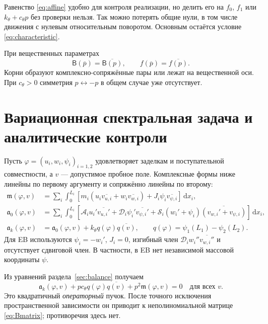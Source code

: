 \documentclass[11pt,a4paper]{article}
\numberwithin{equation}{section}
\newcommand{\dd}{\,\mathrm d}
\newcommand{\A}{\mathcal A}
\newcommand{\D}{\mathcal D}
\newcommand{\Sbeam}{\mathcal S}
\newcommand{\kth}{k_\theta}
\newcommand{\cth}{c_\theta}
\newcommand{\BB}{\mathsf B}
\begin{document}
Равенство \eqref{eq:affine} удобно для контроля реализации, но делить
его на $f_0$, $f_1$ или $\kth+\cth p$ без проверки нельзя. Так можно
потерять общие нули, в том числе движения с нулевым относительным
поворотом. Основным остаётся условие \eqref{eq:characteristic}.

При вещественных параметрах
\begin{equation}
 \BB(\overline p)=\overline{\BB(p)},\qquad
 f(\overline p)=\overline{f(p)}.
 \label{eq:conjugate}
\end{equation}
Корни образуют комплексно-сопряжённые пары или лежат на вещественной оси.
При $\cth>0$ симметрия $p\leftrightarrow-p$ в общем случае уже отсутствует.

\section{Вариационная спектральная задача и аналитические контроли}
\label{sec:weak}

Пусть $\varphi=(u_i,w_i,\psi_i)_{i=1,2}$ удовлетворяет заделкам и
поступательной совместности, а $v$ --- допустимое пробное поле.
Комплексные формы ниже линейны по первому аргументу и сопряжённо линейны
по второму:
\begin{align}
 \mathfrak m(\varphi,v)
 &=\sum_i\int_0^{L_i}
 [m_i(u_i\overline{v_{u,i}}+w_i\overline{v_{w,i}})
   +J_i\psi_i\overline{v_{\psi,i}}]\dd x_i,\label{eq:massform}\\
 \mathfrak a_0(\varphi,v)
 &=\sum_i\int_0^{L_i}
 [\A_i u_i'\overline{v_{u,i}'}+\D_i\psi_i'\overline{v_{\psi,i}'}
 +\Sbeam_i(w_i'+\psi_i)\overline{(v_{w,i}'+v_{\psi,i})}]\dd x_i,
 \label{eq:stiffform}\\
 \mathfrak a_k(\varphi,v)
 &=\mathfrak a_0(\varphi,v)+\kth q(\varphi)\overline{q(v)},
 \qquad q(\varphi)=\psi_1(L_1)-\psi_2(L_2).\label{eq:akform}
\end{align}
Для EB используются $\psi_i=-w_i'$, $J_i=0$,
изгибный член $\D_iw_i''\overline{v_{w,i}''}$ и отсутствует сдвиговой член.
В частности, в EB нет независимой массовой координаты $\psi$.

Из уравнений раздела~\ref{sec:balance} получаем
\begin{equation}
 \boxed{\mathfrak a_k(\varphi,v)
 +p\cth q(\varphi)\overline{q(v)}
 +p^2\mathfrak m(\varphi,v)=0\quad\text{для всех }v.}
 \label{eq:weakpencil}
\end{equation}
Это квадратичный \emph{операторный} пучок. После точного исключения
пространственной зависимости он приводит к неполиномиальной матрице
\eqref{eq:Bmatrix}; противоречия здесь нет.
\end{document}
